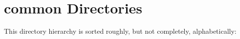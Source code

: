 \section{common Directories}
This directory hierarchy is sorted roughly, but not completely, alphabetically:\begin{CompactList}
\item {}
\end{CompactList}
